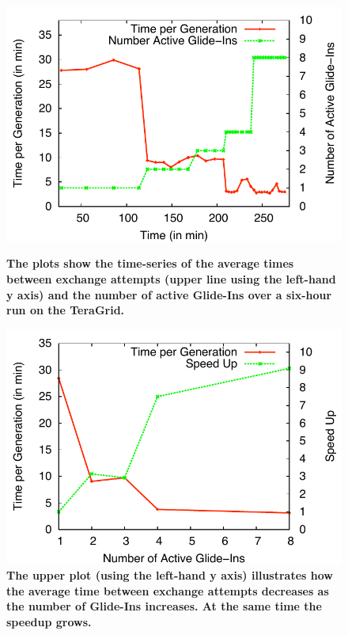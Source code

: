 \documentclass{rspublic}
\begin{document}
\begin{figure}[h]
  \begin{minipage}[t]{.495\textwidth}
    \begin{center}  
      \includegraphics[width=\textwidth]{performance/hepatitis/perf_repex.pdf}
      \caption{\footnotesize \bf The plots show the time-series of the
        average times between exchange attempts (upper line using the
        left-hand y axis) and the number of active Glide-Ins over a
        six-hour run on the TeraGrid.}
      \label{fig:result_A}
    \end{center}
  \end{minipage}
  \hfill
  \begin{minipage}[t]{.48\textwidth}
    \begin{center}  
      \includegraphics[width=\textwidth]{performance/hepatitis/perf_repex2.pdf}
      \caption{\footnotesize \bf The upper plot (using the left-hand
        y axis) illustrates how the average time between exchange attempts
        decreases as the number of Glide-Ins increases. At the same time
        the speedup grows.}
      \label{fig:result_B}
    \end{center}
  \end{minipage}
  \hfill
\end{figure}             
\end{document}
